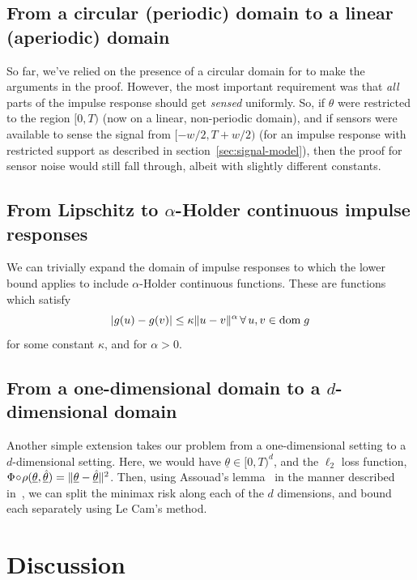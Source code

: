 \documentclass[conference]{IEEEtran}
\providecommand{\v}{}
\renewcommand{\v}[1]{\underline{#1}}
\providecommand{\vhat}{}
\renewcommand{\vhat}[1]{\underline{\hat{#1}}}
\DeclarePairedDelimiter\abs{\lvert}{\rvert}
\DeclarePairedDelimiter\norm{\lVert}{\rVert}
\newcommand{\Phiorho}{\Phi\!\circ\!\rho}
\begin{document}
\subsection{From a circular (periodic) domain to a linear (aperiodic) domain}

So far, we've relied on the presence of a circular domain for to make the
arguments in the proof. However, the most important requirement was that
\emph{all} parts of the impulse response should get \emph{sensed} uniformly.
So, if $\theta$ were restricted to the region $[0, T)$ (now on a linear,
non-periodic domain), and if sensors were available to sense the signal from
$[-w/2, T{+}w/2)$ (for an impulse response with restricted support as described
in section~\ref{sec:signal-model}), then the proof for sensor noise would still
fall through, albeit with slightly different constants.

\subsection{From Lipschitz to $\alpha$-Holder continuous impulse responses}

We can trivially expand the domain of impulse responses to which the lower
bound applies to include $\alpha$-Holder continuous functions. These are
functions which satisfy
\begin{equation}
	\abs{g(u) - g(v)} \leq \kappa \norm{u - v}^\alpha \, \forall \, u, v \in \text{dom} \; g
\end{equation}
for some constant $\kappa$, and for $\alpha > 0$.

\subsection{From a one-dimensional domain to a $d$-dimensional domain}

Another simple extension takes our problem from a one-dimensional setting to a
$d$-dimensional setting. Here, we would have $\v\theta \in [0, T)^d$, and the
$\ell_2$ loss function, $\Phiorho(\v\theta, \vhat\theta) = \norm{\v\theta -
\vhat\theta}^2$. Then, using Assouad's lemma~\cite{Tsybakov2009Introduction} in
the manner described in~\cite{Duchi2015Information}, we can split the minimax
risk along each of the $d$ dimensions, and bound each separately using Le Cam's
method.

\section{Discussion}
\label{sec:discussion}
\end{document}
